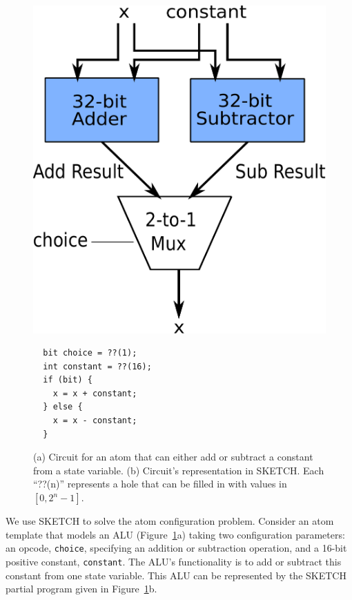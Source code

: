 \begin{figure}[h]
  \begin{minipage}{0.4\columnwidth}
  \begin{center}
  \includegraphics[width=\columnwidth]{circuit.pdf}
  \end{center}
  \end{minipage}
  \begin{minipage}{0.55\columnwidth}
  \begin{center}
  \begin{lstlisting}
  bit choice = ??(1);
  int constant = ??(16);
  if (bit) {
    x = x + constant;
  } else {
    x = x - constant;
  }
  \end{lstlisting}
  \end{center}
  \end{minipage}
\caption{\small (a) Circuit for an atom that can either add or subtract a
constant from a state variable.  (b) Circuit's representation in SKETCH.
Each ``??(n)'' represents a hole that can be filled in with values in
  $[0, 2^n -1]$.}
\label{fig:alu_in_sketch}
\end{figure}

We use SKETCH to solve the atom configuration problem.  Consider an atom
template that models an ALU (Figure~\ref{fig:alu_in_sketch}a) taking two
configuration parameters: an opcode, \texttt{choice}, specifying an addition or subtraction
operation, and a 16-bit positive constant, \texttt{constant}.  The ALU's functionality is to add
or subtract this constant from one state variable. This ALU can be represented
by the SKETCH partial program given in Figure~\ref{fig:alu_in_sketch}b.

